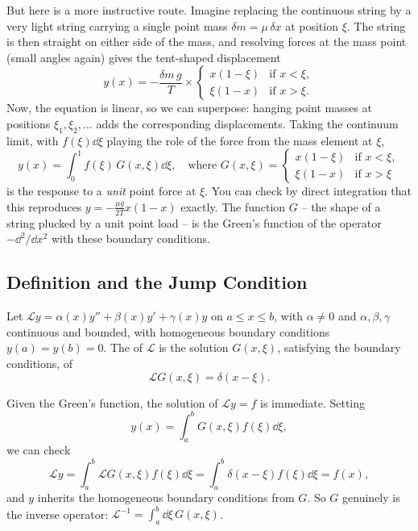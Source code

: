 \documentclass[a4paper]{scrartcl}
\begin{document}
But here is a more instructive route. Imagine replacing the continuous string by a very light string carrying a single point mass $\delta m = \mu \, \delta x$ at position $\xi$. The string is then straight on either side of the mass, and resolving forces at the mass point (small angles again) gives the tent-shaped displacement
$$
y(x) = -\frac{\delta m\, g}{T} \times \begin{cases}
    x (1 - \xi) &\mbox{if } x < \xi, \\
    \xi (1 - x) &\mbox{if } x > \xi.
\end{cases}
$$
Now, the equation is linear, so we can superpose: hanging point masses at positions $\xi_1, \xi_2, \dots$ adds the corresponding displacements. Taking the continuum limit, with $f(\xi) \dd \xi$ playing the role of the force from the mass element at $\xi$,
$$
y(x) = \int_0^1 f(\xi)\, G(x, \xi) \dd \xi, \quad \text{where } G(x, \xi) = \begin{cases}
    x(1 - \xi) &\mbox{if } x < \xi, \\
    \xi(1 - x) &\mbox{if } x > \xi
\end{cases}
$$
is the response to a \emph{unit} point force at $\xi$. You can check by direct integration that this reproduces $y = -\frac{\mu g}{2T}x(1 - x)$ exactly. The function $G$ -- the shape of a string plucked by a unit point load -- is the Green's function of the operator $-\dd^2/\dd x^2$ with these boundary conditions.

\subsection{Definition and the Jump Condition}

\begin{definition}
    Let $\mathcal{L} y = \alpha(x) y'' + \beta(x) y' + \gamma(x) y$ on $a \leq x \leq b$, with $\alpha \neq 0$ and $\alpha, \beta, \gamma$ continuous and bounded, with homogeneous boundary conditions $y(a) = y(b) = 0$. The  of $\mathcal{L}$ is the solution $G(x, \xi)$, satisfying the boundary conditions, of
    $$
    \mathcal{L} G(x, \xi) = \delta(x - \xi).
    $$
\end{definition}

Given the Green's function, the solution of $\mathcal{L}y = f$ is immediate. Setting
$$
y(x) = \int_a^b G(x, \xi) f(\xi) \dd \xi,
$$
we can check
$$
\mathcal{L} y = \int_a^b \mathcal{L}G(x, \xi) f(\xi) \dd \xi = \int_a^b \delta(x - \xi) f(\xi) \dd \xi = f(x),
$$
and $y$ inherits the homogeneous boundary conditions from $G$. So $G$ genuinely is the inverse operator: $\mathcal{L}^{-1} = \int_a^b \dd \xi \, G(x, \xi)$.
\end{document}
